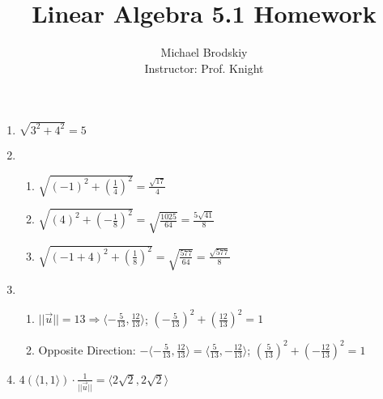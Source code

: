 \documentclass[12pt]{article}
\title{Linear Algebra 5.1 Homework}
\date{}
\author{Michael Brodskiy\\ \small Instructor: Prof. Knight}
\begin{document}
\maketitle

\begin{enumerate}

    \begin{center}
      \underline{Problems 1, 5, 9, 13, 17, 18, 21, 25, 27, 33, 41, 45, 49, 53, 57, 67, 71, 73, 77, 83, 84}
    \end{center}

  \item $\sqrt{3^2+4^2}=5$

    \setcounter{enumi}{4}

  \item

    \begin{enumerate}

      \item $\sqrt{\left( -1 \right)^2 + \left( \frac{1}{4} \right)^2}=\frac{\sqrt{17}}{4}$

      \item $\sqrt{\left( 4 \right)^2+\left( -\frac{1}{8} \right)^2}=\sqrt{\frac{1025}{64}}=\frac{5\sqrt{41}}{8}$

      \item $\sqrt{\left( -1+4 \right)^2+\left( \frac{1}{8} \right)^2}=\sqrt{\frac{577}{64}}=\frac{\sqrt{577}}{8}$

    \end{enumerate}

    \setcounter{enumi}{8}

  \item

    \begin{enumerate}

      \item $||\overrightarrow{u}||=13\Rightarrow\langle-\frac{5}{13},\frac{12}{13}\rangle$; $\left( -\frac{5}{13} \right)^2+\left( \frac{12}{13} \right)^2=1$

      \item Opposite Direction: $-\langle-\frac{5}{13},\frac{12}{13}\rangle=\langle\frac{5}{13},-\frac{12}{13}\rangle$; $\left( \frac{5}{13} \right)^2+\left( -\frac{12}{13} \right)^2=1$

    \end{enumerate}

    \setcounter{enumi}{12}

  \item $4\left( \langle1,1\rangle \right)\cdot\frac{1}{||\overrightarrow{u}||}=\langle2\sqrt{2},2\sqrt{2}\rangle$


\end{enumerate}
\end{document}
